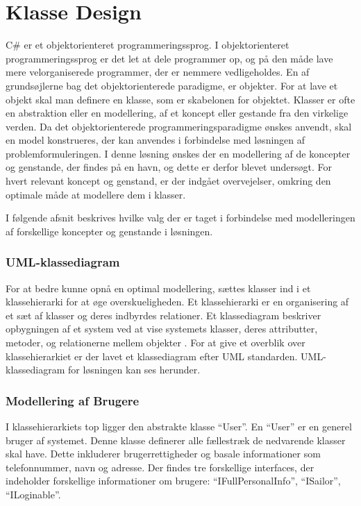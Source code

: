 \section{Klasse Design}
\label{sec:klasse_design}
C\# er et objektorienteret programmeringssprog. I objektorienteret programmeringssprog er det let at dele programmer op, og på den måde lave mere velorganiserede programmer, der er nemmere vedligeholdes. En af grundsøjlerne bag det objektorienterede paradigme, er objekter. For at lave et objekt skal man definere en klasse, som er skabelonen for objektet. Klasser er ofte en abstraktion eller en modellering, af et koncept eller gestande fra den virkelige verden. Da det objektorienterede programmeringsparadigme ønskes anvendt, skal en model konstrueres, der kan anvendes i forbindelse med løsningen af problemformuleringen. I denne løsning ønskes der en modellering af de koncepter og genstande, der findes på en havn, og dette er derfor blevet undersøgt. For hvert relevant koncept og genstand, er der indgået overvejelser, omkring den optimale måde at modellere dem i klasser.

I følgende afsnit beskrives hvilke valg der er taget i forbindelse med modelleringen af forskellige koncepter og genstande i løsningen. 

\subsubsection{UML-klassediagram}

For at bedre kunne opnå en optimal modellering, sættes klasser ind i et klassehierarki for at øge overskueligheden. Et klassehierarki er en organisering af et sæt af klasser og deres indbyrdes relationer. Et klassediagram beskriver opbygningen af et system ved at vise systemets klasser, deres attributter, metoder, og relationerne mellem objekter \cite{martin2006agile}. For at give et overblik over klassehierarkiet er der lavet et klassediagram efter UML standarden. UML-klassediagram for løsningen kan ses herunder.


\subsubsection{Modellering af Brugere}
\label{sub:brugere_af_programmet}

I klassehierarkiets top ligger den abstrakte klasse \enquote{User}. En \enquote{User} er en generel bruger af systemet. Denne klasse definerer alle fællestræk de nedvarende klasser skal have. Dette inkluderer brugerrettigheder og basale informationer som telefonnummer, navn og adresse. Der findes tre forskellige interfaces, der indeholder forskellige informationer om brugere: \enquote{IFullPersonalInfo}, \enquote{ISailor}, \enquote{ILoginable}.

